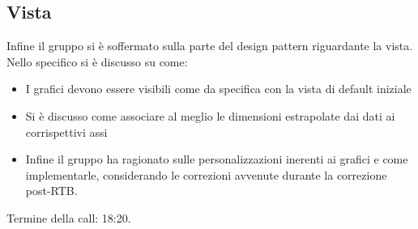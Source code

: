 \subsection{Vista}
Infine il gruppo si è soffermato sulla parte del design pattern riguardante la vista. \newline
Nello specifico si è discusso su come:
\begin{itemize}
	\item I grafici devono essere visibili come da specifica con la vista di default iniziale
	\item Si è discusso come associare al meglio le dimensioni estrapolate dai dati ai corrispettivi assi
	\item Infine il gruppo ha ragionato sulle personalizzazioni inerenti ai grafici e come implementarle, considerando
		  le correzioni avvenute durante la correzione post-RTB.
\end{itemize}
\noindent Termine della call: 18:20.
